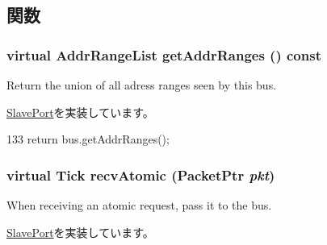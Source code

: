\subsection{関数}
\hypertarget{classNoncoherentBus_1_1NoncoherentBusSlavePort_a9367d737cb872cb8573f44b501f99363}{
\subsubsection[{getAddrRanges}]{\setlength{\rightskip}{0pt plus 5cm}virtual {\bf AddrRangeList} getAddrRanges () const}}
\label{classNoncoherentBus_1_1NoncoherentBusSlavePort_a9367d737cb872cb8573f44b501f99363}
Return the union of all adress ranges seen by this bus. 

\hyperlink{classSlavePort_a6e967f8921e80748eb2be35b6b481a7e}{SlavePort}を実装しています。


\begin{DoxyCode}
133         { return bus.getAddrRanges(); }
\end{DoxyCode}
\hypertarget{classNoncoherentBus_1_1NoncoherentBusSlavePort_a9b5348b3521da3a6333e6b0eed3b98e6}{
\subsubsection[{recvAtomic}]{\setlength{\rightskip}{0pt plus 5cm}virtual {\bf Tick} recvAtomic ({\bf PacketPtr} {\em pkt})}}
\label{classNoncoherentBus_1_1NoncoherentBusSlavePort_a9b5348b3521da3a6333e6b0eed3b98e6}
When receiving an atomic request, pass it to the bus. 

\hyperlink{classSlavePort_a428ab07671bc9372dc44a2487b12a726}{SlavePort}を実装しています。


